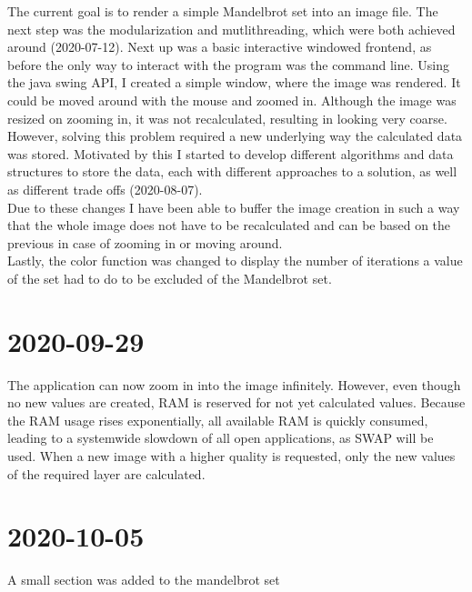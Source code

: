 \documentclass[10pt,a4paper]{article}
\begin{document}
	The current goal is to render a simple Mandelbrot set into an image file. The next step was the modularization and mutlithreading, which were both achieved around (2020-07-12). Next up was a basic interactive windowed frontend, as before the only way to interact with the program was the command line. Using the java swing API, I created a simple window, where the image was rendered. It could be moved around with the mouse and zoomed in. Although the image was resized on zooming in, it was not recalculated, resulting in looking very coarse. However, solving this problem required a new underlying way the calculated data was stored. Motivated by this I started to develop different algorithms and data structures to store the data, each with different approaches to a solution, as well as different trade offs (2020-08-07).\\
	Due to these changes I have been able to buffer the image creation in such a way that the whole image does not have to be recalculated and can be based on the previous in case of zooming in or moving around.\\
	Lastly, the color function was changed to display the number of iterations a value of the set had to do to be excluded of the Mandelbrot set.
	\section{2020-09-29}
	The application can now zoom in into the image infinitely. However, even though no new values are created, RAM is reserved for not yet calculated values. Because the RAM usage rises exponentially, all available RAM is quickly consumed, leading to a systemwide slowdown of all open applications, as SWAP will be used.
	When a new image with a higher quality is requested, only the new values of the required layer are calculated. 
	\section{2020-10-05}
	A small section was added to the mandelbrot set
\end{document}
